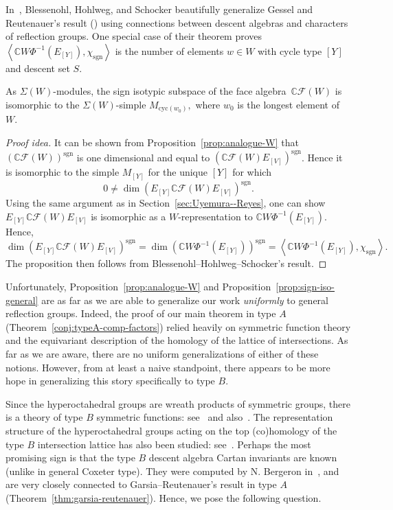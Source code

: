 \documentclass[ALCO, Unicode]{cedram}
\def\C{{\mathbb{C}}}
\def\sgn{\mathrm{sgn}}
\begin{document}
In~\cite[Thm 1.1]{blesshohlshock}, Blessenohl, Hohlweg, and Schocker beautifully generalize Gessel and Reutenauer's result (\cite[Theorem 2.1]{gesselreutenauer}) using connections between descent algebras and characters of reflection groups. One special case of their theorem proves $\left\langle \C W \Phi^{-1}\left(E_{[Y]}\right), \chi_{\sgn} \right \rangle$ is the number of elements $w \in W$ with cycle type $[Y]$ and descent set $S.$ 
 
 \begin{prop}\label{prop:sign-iso-general}
     As $\Sigma(W)$-modules, the sign isotypic subspace of the face algebra~$\C \mathcal{F}(W)$ is isomorphic to the $\Sigma(W)$-simple $M_{\mathrm{cyc}(w_0)},$ where $w_0$ is the longest element of $W.$
 \end{prop}
 \begin{proof}[Proof idea]
     It can be shown from Proposition~\ref{prop:analogue-W} that $\left(\C \mathcal{F}(W)\right)^{\sgn}$ is one dimensional and equal to $\left(\C \mathcal{F}(W) E_{[V]}\right)^{\sgn}$. Hence it is isomorphic to the simple $M_{[Y]}$ for the unique $[Y]$ for which  \[0 \neq \dim \left(E_{[Y]}\C\mathcal{F}(W)E_{[V]}\right)^{\sgn}.\]  Using the same argument as in Section~\ref{sec:Uyemura--Reyes}, one can show $E_{[Y]}\C\mathcal{F}(W)E_{[V]}$ is isomorphic as a $W$-representation to $\C W \Phi^{-1}\left(E_{[Y]}\right).$ Hence,  \[\dim \left(E_{[Y]}\C\mathcal{F}(W)E_{[V]}\right)^{\sgn} = \dim \left(\C W\Phi^{-1}\left(E_{[Y]}\right)\right)^{\sgn}= \left \langle \C W \Phi^{-1} \left(E_{[Y]}\right), \chi_{\sgn}\right \rangle.\]
     The proposition then follows from Blessenohl--Hohlweg--Schocker's result.
 \end{proof}

 Unfortunately, Proposition~\ref{prop:analogue-W} and Proposition~\ref{prop:sign-iso-general} are as far as we are able to generalize our work \textit{uniformly} to general reflection groups. Indeed, the proof of our main theorem in type $A$ (Theorem~\ref{conj:typeA-comp-factors}) relied heavily on symmetric function theory and the {equivariant} description of the homology of the lattice of intersections. As far as we are aware, there are no uniform generalizations of either of these notions. However, from at least a naive standpoint, there appears to be more hope in generalizing this story specifically to type $B.$ 

Since the hyperoctahedral groups are wreath products of symmetric groups, there is a theory of type $B$ symmetric functions: see~\cite[\S 5 of Appendix B]{macdonald} and also~\cite[\S 2]{Poirier}. 
The representation structure of the hyperoctahedral groups acting on the top (co)homology of the type $B$ intersection lattice has also been studied: see~\cite{bergeronfreeliealgebra, GottliebWachs, HanlonTypeB}. Perhaps the most promising sign is that the type $B$ descent algebra Cartan invariants are known (unlike in general Coxeter type). They were computed by N. Bergeron in~\cite{Bergerons-hyper2}, and are very closely connected to Garsia--Reutenauer's result in type $A$ (Theorem~\ref{thm:garsia-reutenauer}). Hence, we pose the following question.
\end{document}
